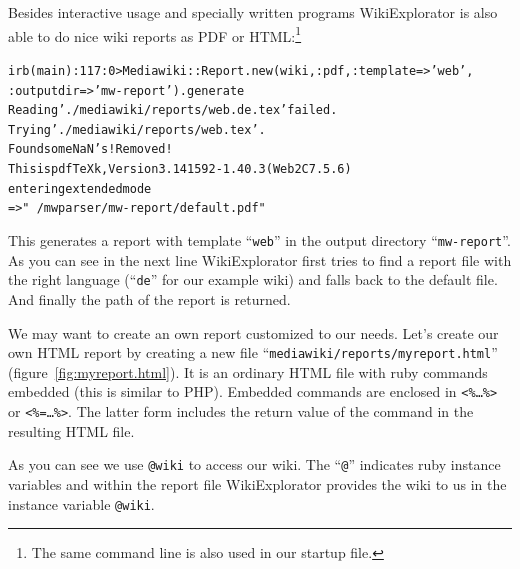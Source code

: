 \documentclass[a4paper]{scrartcl}
\newcounter{tcounter}
\newcommand{\tcount}{\makebox[0pt][r]{\tiny\thetcounter~}}
\newenvironment{typed}{\refstepcounter{tcounter}\bgroup\setlength{\topsep}{0pt}\renewcommand{\FrameCommand}[1]{\fcolorbox{black!30}{bgcolor}{##1}\tcount}\MakeFramed{\FrameRestore}\begin{alltt}\small}{\end{alltt}\endMakeFramed\egroup\par\aftergroup\noindent\aftergroup\ignorespaces}
\newcommand{\file}[1]{\texttt{\color{file}#1}}
\newcommand{\code}[1]{\texttt{\color{code}#1}}
\newcommand{\cmd}[1]{\texttt{\color{cmd}#1}}
\newcommand{\p}{\textcolor{prompt}}
\renewcommand{\c}{\textcolor{cmd}}
\begin{document}
Besides interactive usage and specially written programs
WikiExplorator is also able to do nice wiki reports as PDF or
HTML:\footnote{The same command line is also used in our startup
  file.}
\begin{typed}
\p{irb(main):117:0>} \c{Mediawiki::Report.new(wiki, :pdf, :template => 'web', 
                                       :outputdir => 'mw-report').generate}
Reading './mediawiki/reports/web.de.tex' failed. 
Trying './mediawiki/reports/web.tex'.
Found some NaN's! Removed!
This is pdfTeXk, Version 3.141592-1.40.3 (Web2C 7.5.6)
entering extended mode
=> "~/mwparser/mw-report/default.pdf"
\end{typed}
This generates a report with template ``\code{web}'' in the output
directory ``\file{mw-report}''. As you can see in the next line
WikiExplorator first tries to find a report file with the right
language (``\cmd{de}'' for our example wiki) and falls back to the
default file. And finally the path of the report is returned.

We may want to create an own report customized to our needs. Let's
create our own HTML report by creating a new file
``\file{mediawiki/reports/myreport.html}''
(figure~\ref{fig:myreport.html}). It is an ordinary HTML file with
ruby commands embedded (this is similar to PHP). Embedded commands are
enclosed in \cmd{<\%\dots\%>} or \cmd{<\%=\dots\%>}. The latter form
includes the return value of the command in the resulting HTML file.

As you can see we use \cmd{@wiki} to access our wiki. The ``\cmd{@}''
indicates ruby instance variables and within the report file
WikiExplorator provides the wiki to us in the instance variable
\cmd{@wiki}. 
\end{document}
